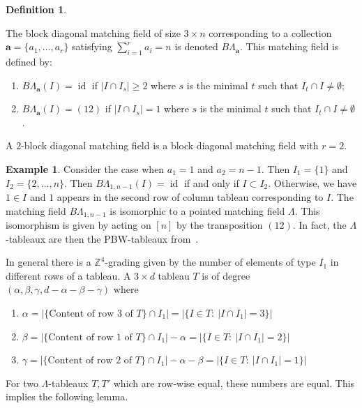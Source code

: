 \documentclass[10pt]{amsart}
\theoremstyle{definition}
\newtheorem{Definition}[theo]{Definition}
\newtheorem{exam}[theo]{Example}
\newcommand{\BLambda}{{B\Lambda}}
\DeclareMathOperator{\id}{id}
\begin{document}
\begin{Definition}\label{def:blockdiagcolumns}

The block diagonal matching field of size $3 \times n$ corresponding to a collection $\mathbf{a} = \{a_1, \ldots, a_{r}\}$ satisfying $\sum_{i = 1}^r a_i = n$ is denoted $\BLambda_{\mathbf{a}}$. This matching field is defined by:
\begin{enumerate}

\item $\BLambda_{\mathbf{a}}(I) = \id$ if $|I \cap I_s| \geq 2$ where $s$ is the minimal $t$ such that $I_t \cap I \neq \emptyset$;

\item \label{transpose} $\BLambda_{\mathbf{a}}(I) = (12)$ if $|I \cap I_s| = 1$ where $s$ is the minimal $t$ such that $I_t \cap I \neq \emptyset$. 

 \end{enumerate}
 A $2$-block diagonal matching field is a block diagonal matching field with $r = 2$. 
\end{Definition}

\begin{exam}
Consider the case when $a_1 = 1 $ and $a_2 = n-1$. Then $I_1 = \{1\}$ and $I_2 = \{2, \ldots , n\}$. 
Then $\BLambda_{1, n-1}(I) = \id$ if and only if $I \subset I_2$. Otherwise, we have $1 \in I$ and $1$ appears in the second row of column tableau corresponding to $I$.
The matching field $\BLambda_{1,n-1}$ is isomorphic to a pointed matching field $\Lambda$. This isomorphism is given by acting on $[n]$ by the transposition $(12)$. 
In fact, the $\Lambda$-tableaux are then the PBW-tableaux from~\cite{Feigen}.
 \end{exam}



 
\setcounter{theo}{3}


 
 In general there is a $\mathbb{Z}^4$-grading given by the number of elements of type $I_1$ in different rows of a tableau. A $3\times d$ tableau $T$ is of degree $(\alpha, \beta,\gamma, d-\alpha-\beta-\gamma)$ 
 where 
\begin{enumerate}
\item $\alpha=|\{\text{Content of row 3 of } T\}\cap I_1| = |\{I\in T: \ |I \cap I_1| = 3\}|$ 
\item $\beta=|\{\text{Content of row 1 of } T\}\cap I_1|-\alpha = |\{I\in T: \ |I \cap I_1| = 2\}|$ 
\item $\gamma=|\{\text{Content of row 2 of } T\}\cap I_1|-\alpha-\beta = |\{I\in T: \ |I \cap I_1| = 1\}|$ 
\end{enumerate}
For two $\Lambda$-tableaux $T,T'$ which are row-wise equal, these numbers are equal. This implies the following lemma.
 
\end{document}
